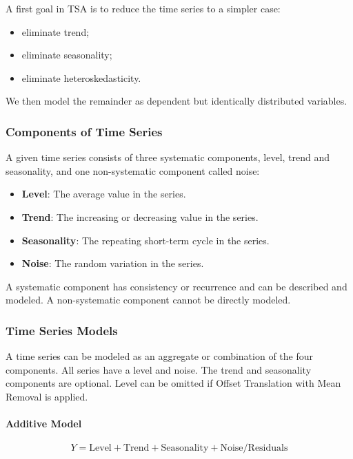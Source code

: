 A first goal in TSA is to reduce the time series to a simpler case:
\begin{itemize}
    \item eliminate trend;
    \item eliminate seasonality;
    \item eliminate heteroskedasticity.
\end{itemize}

We then model the remainder as dependent but identically distributed variables.

\subsubsection{Components of Time Series}

A given time series consists of three systematic components, level, trend and seasonality, and one non-systematic component called noise:
\begin{itemize}
    \item \textbf{Level}: The average value in the series.
    \item \textbf{Trend}: The increasing or decreasing value in the series.
    \item \textbf{Seasonality}: The repeating short-term cycle in the series.
    \item \textbf{Noise}: The random variation in the series.
\end{itemize}

A systematic component has consistency or recurrence and can be described and modeled. A non-systematic component cannot be directly modeled.

\subsubsection{Time Series Models}

A time series can be modeled as an aggregate or combination of the four components. All series have a level and noise. The trend and seasonality components are optional. Level can be omitted if Offset Translation with Mean Removal is applied.

\paragraph{Additive Model}
\begin{equation}
Y = \text{Level} + \text{Trend} + \text{Seasonality} + \text{Noise/Residuals}
\end{equation}


